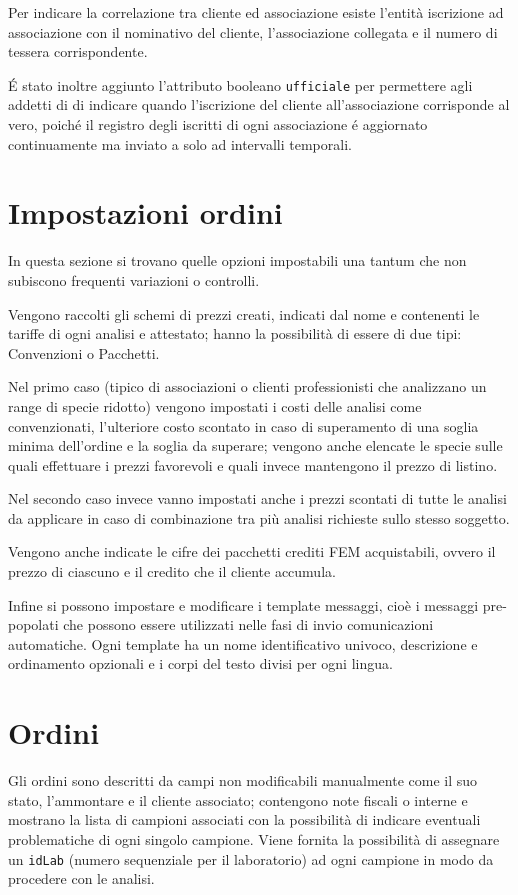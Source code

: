 Per indicare la correlazione tra cliente ed associazione esiste l'entità \textsf{iscrizione ad associazione} con il nominativo del cliente, l'associazione collegata e il numero di tessera corrispondente.

É stato inoltre aggiunto l'attributo booleano \texttt{ufficiale} per permettere agli addetti di {\fem} di indicare quando l'iscrizione del cliente all'associazione corrisponde al vero, poiché il registro degli iscritti di ogni associazione é aggiornato continuamente ma inviato a {\fem} solo ad intervalli temporali.

\section*{Impostazioni ordini}
In questa sezione si trovano quelle opzioni impostabili una tantum che non subiscono frequenti variazioni o controlli.

Vengono raccolti gli \textsf{schemi di prezzi} creati, indicati dal nome e contenenti le tariffe di ogni analisi e attestato; hanno la possibilità di essere di due tipi: Convenzioni o Pacchetti. 

Nel primo caso (tipico di associazioni o clienti professionisti che analizzano un range di specie ridotto) vengono impostati i costi delle analisi come convenzionati, l'ulteriore costo scontato in caso di superamento di una soglia minima dell'ordine e la soglia da superare; vengono anche elencate le specie sulle quali effettuare i prezzi favorevoli e quali invece mantengono il prezzo di listino.

Nel secondo caso invece vanno impostati anche i prezzi scontati di tutte le analisi da applicare in caso di combinazione tra più analisi richieste sullo stesso soggetto.

Vengono anche indicate le cifre dei \textsf{pacchetti crediti FEM} acquistabili, ovvero il prezzo di ciascuno e il credito che il cliente accumula.

Infine si possono impostare e modificare i \textsf{template messaggi}, cioè i messaggi pre-popolati che possono essere utilizzati nelle fasi di invio comunicazioni automatiche. Ogni template ha un nome identificativo univoco, descrizione e ordinamento opzionali e i corpi del testo divisi per ogni lingua.

\section*{Ordini}
Gli \textsf{ordini} sono descritti da campi non modificabili manualmente come il suo stato, l'ammontare e il cliente associato; contengono note fiscali o interne e mostrano la lista di campioni associati con la possibilità di indicare eventuali problematiche di ogni singolo campione. Viene fornita la possibilità di assegnare un \texttt{idLab} (numero sequenziale per il laboratorio) ad ogni campione in modo da procedere con le analisi. 

